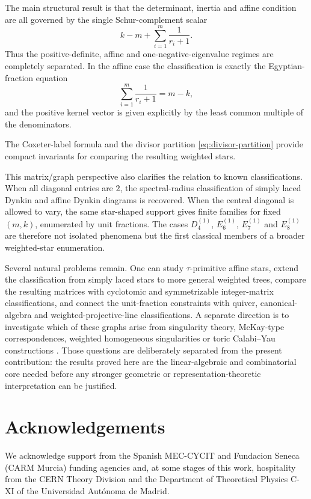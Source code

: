 \documentclass[11pt,a4paper]{article}
\theoremstyle{definition}
\theoremstyle{plain}
\begin{document}
The main structural result is that the determinant, inertia and affine condition are all governed by the single Schur-complement scalar
\[
        k-m+\sum_{i=1}^m\frac{1}{r_i+1}.
\]
Thus the positive-definite, affine and one-negative-eigenvalue regimes are completely separated.  In the affine case the classification is exactly the Egyptian-fraction equation
\[
        \sum_{i=1}^m\frac{1}{r_i+1}=m-k,
\]
and the positive kernel vector is given explicitly by the least common multiple of the denominators.  

The Coxeter-label formula and the divisor partition \eqref{eq:divisor-partition} provide compact invariants for comparing the resulting weighted stars.

This matrix/graph perspective also clarifies the relation to known classifications.  When all diagonal entries are $2$, the spectral-radius classification of simply laced Dynkin and affine Dynkin diagrams is recovered.  When the central diagonal is allowed to vary, the same star-shaped support gives finite families for fixed $(m,k)$, enumerated by unit fractions.  The cases $D_4^{(1)}$, $E_6^{(1)}$, $E_7^{(1)}$ and $E_8^{(1)}$ are therefore not isolated phenomena but the first classical members of a broader weighted-star enumeration.

Several natural problems remain.  One can study $\tau$-primitive affine stars, extend the classification from simply laced stars to more general weighted trees, compare the resulting matrices with cyclotomic and symmetrizable integer-matrix classifications, and connect the unit-fraction constraints with quiver, canonical-algebra and weighted-projective-line classifications.  A separate direction is to investigate which of these graphs arise from singularity theory, McKay-type correspondences, weighted homogeneous singularities or toric Calabi--Yau constructions \citep{McKay1980,EbelingTakahashi2011}.  Those questions are deliberately separated from the present contribution: the results proved here are the linear-algebraic and combinatorial core needed before any stronger geometric or representation-theoretic interpretation can be justified.

\section*{Acknowledgements}

We acknowledge support from  the Spanish MEC-CYCIT and Fundacion Seneca (CARM Murcia) funding agencies and, at some stages of this work, hospitality from the CERN Theory Division and the Department of Theoretical Physics C-XI of the Universidad Aut\'onoma de Madrid.
\end{document}
